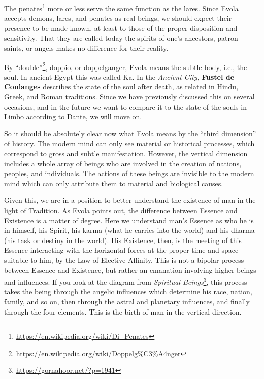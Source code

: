 The penates\footnote{\url{https://en.wikipedia.org/wiki/Di_Penates}} more or less serve the same function as the lares. Since Evola accepts demons, lares, and penates as real beings, we should expect their presence to be made known, at least to those of the proper disposition and sensitivity. That they are called today the spirits of one's ancestors, patron saints, or angels makes no difference for their reality.

By ``double''\footnote{\url{https://en.wikipedia.org/wiki/Doppelg\%C3\%A4nger}}, doppio, or doppelganger, Evola means the subtle body, i.e., the soul. In ancient Egypt this was called Ka. In the \emph{Ancient City}, \textbf{Fustel de Coulanges} describes the state of the soul after death, as related in Hindu, Greek, and Roman traditions. Since we have previously discussed this on several occasions, and in the future we want to compare it to the state of the souls in Limbo according to Dante, we will move on.

So it should be absolutely clear now what Evola means by the ``third dimension'' of history. The modern mind can only see material or historical processes, which correspond to gross and subtle manifestation. However, the vertical dimension includes a whole array of beings who are involved in the creation of nations, peoples, and individuals. The actions of these beings are invisible to the modern mind which can only attribute them to material and biological causes.

Given this, we are in a position to better understand the existence of man in the light of Tradition. As Evola points out, the difference between Essence and Existence is a matter of degree. Here we understand man's Essence as who he is in himself, his Spirit, his karma (what he carries into the world) and his dharma (his task or destiny in the world). His Existence, then, is the meeting of this Essence interacting with the horizontal forces at the proper time and space suitable to him, by the Law of Elective Affinity. This is not a bipolar process between Essence and Existence, but rather an emanation involving higher beings and influences. If you look at the diagram from \textit{Spiritual Beings}\footnote{\url{https://gornahoor.net/?p=1941}}, this process takes the being through the angelic influences which determine his race, nation, family, and so on, then through the astral and planetary influences, and finally through the four elements. This is the birth of man in the vertical direction.


